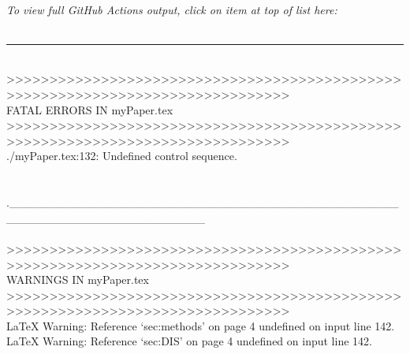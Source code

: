 \documentclass{article}
\begin{document}
\\
\noindent\emph{To view full GitHub Actions output, click on item at top of list here:}\\
 \color{black} \\
\noindent\rule{7in}{0.7pt}\\
\noindent >>>>>>>>>>>>>>>>>>>>>>>>>>>>>>>>>>>>>>>>>>>>>>>>>>>>>>>>>>>>>>>>>>>>>>>>>>>>>>> \color{black} \\
\noindent               FATAL ERRORS IN myPaper.tex \color{black} \\
\noindent >>>>>>>>>>>>>>>>>>>>>>>>>>>>>>>>>>>>>>>>>>>>>>>>>>>>>>>>>>>>>>>>>>>>>>>>>>>>>>> \color{black} \\
\noindent ./myPaper.tex:132: Undefined control sequence. \color{black} \\
 \color{black} \\
 \color{black} \\
\noindent ._______________________________________________________________________ \color{black} \\
\noindent   \color{black} \\
\noindent >>>>>>>>>>>>>>>>>>>>>>>>>>>>>>>>>>>>>>>>>>>>>>>>>>>>>>>>>>>>>>>>>>>>>>>>>>>>>>> \color{black} \\
\noindent               WARNINGS IN myPaper.tex \color{black} \\
\noindent >>>>>>>>>>>>>>>>>>>>>>>>>>>>>>>>>>>>>>>>>>>>>>>>>>>>>>>>>>>>>>>>>>>>>>>>>>>>>>> \color{black} \\
\noindent LaTeX Warning: Reference `sec:methods' on page 4 undefined on input line 142. \color{black} \\
\noindent LaTeX Warning: Reference `sec:DIS' on page 4 undefined on input line 142. \color{black} \\
 \color{black} \\
 \color{black} \\
\end{document}
